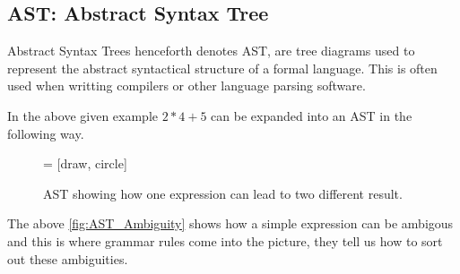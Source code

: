 \subsection{AST\@: Abstract Syntax Tree}

Abstract Syntax Trees henceforth denotes AST, are tree diagrams used to represent
the abstract syntactical structure of a formal language. This is often used when 
writting compilers or other language parsing software.

In the above given example $ 2 * 4 + 5 $ can be expanded into an AST in the following
way.

\begin{figure}[h]
  \centering

  \usetikzlibrary{positioning}
   = [draw, circle]
  \caption{AST showing how one expression can lead to two different result.}%
  \label{fig:AST_Ambiguity}
\end{figure}

The above \autoref{fig:AST_Ambiguity} shows how a simple expression can be ambigous
and this is where grammar rules come into the picture, they tell us how to sort out 
these ambiguities. 
